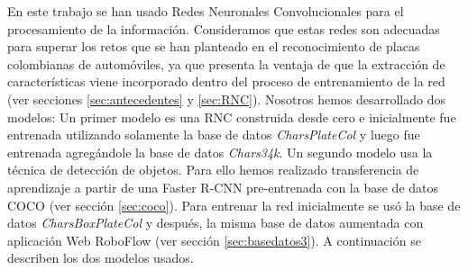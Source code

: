 En este trabajo se han usado Redes Neuronales Convolucionales para el procesamiento de la información. Consideramos que estas redes son adecuadas para superar los retos que se han planteado  en el reconocimiento de placas colombianas de automóviles, ya que presenta la ventaja de que la extracción de características viene incorporado dentro del proceso de entrenamiento de la red (ver secciones \ref{sec:antecedentes} y \ref{sec:RNC}). Nosotros hemos desarrollado dos modelos: Un primer modelo es una RNC construida desde cero e inicialmente fue entrenada utilizando solamente la base de datos \textit{CharsPlateCol} y luego fue entrenada agregándole la base de datos \textit{Chars34k}. Un segundo modelo usa la técnica de detección de objetos. Para ello hemos realizado transferencia de aprendizaje a partir de una Faster R-CNN pre-entrenada con la base de datos COCO (ver sección \ref{sec:coco}). Para entrenar la red inicialmente se usó la base de datos \textit{CharsBoxPlateCol} y después, la misma base de datos aumentada con aplicación Web RoboFlow (ver sección \ref{sec:basedatos3}).  A continuación se describen los dos modelos usados.    



